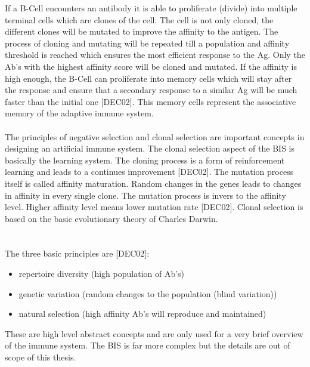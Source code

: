 If a B-Cell encounters an antibody it is able to proliferate (divide) into multiple terminal cells which are clones of the cell. The cell is not only cloned, the different clones will be mutated to improve the affinity to the antigen. The process of cloning and mutating will be repeated till a population and affinity threshold is reached which ensures the most efficient response to the Ag. Only the Ab’s with the highest affinity score will be cloned and mutated. If the affinity is high enough, the B-Cell can proliferate into memory cells which will stay after the response and ensure that a secondary response to a similar Ag will be much faster than the initial one [DEC02]. This memory cells represent the associative memory of the adaptive immune system. 
\\\\
The principles of negative selection and clonal selection are important concepts in designing an artificial immune system. The clonal selection aspect of the BIS is basically the learning system. The cloning process is a form of reinforcement learning and leads to a continues improvement [DEC02].
The mutation process itself is called affinity maturation. Random changes in the genes leads to changes in affinity in every single clone. The mutation process is invers to the affinity level. Higher affinity level means lower mutation rate [DEC02].  
Clonal selection is based on the basic evolutionary theory of Charles Darwin.\\\\\\ The three basic principles are [DEC02]:
\\
\begin{itemize}
	\item 	repertoire diversity (high population of Ab’s)
	\item 	genetic variation (random changes to the population (blind variation))
	\item 	natural selection (high affinity Ab’s will reproduce and maintained) 
	
\end{itemize}

These are high level abstract concepts and are only used for a very brief overview of the immune system. The BIS is far more complex but the details are out of scope of this thesis.




